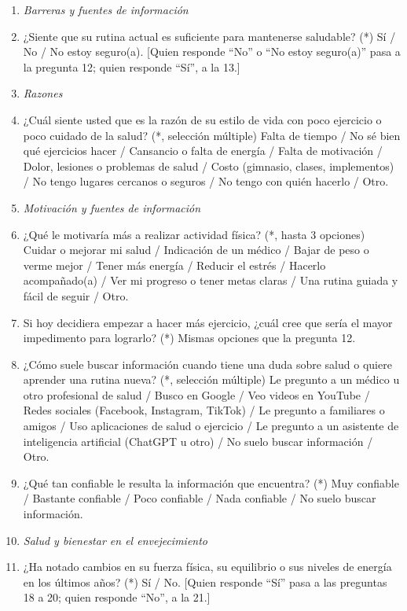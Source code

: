 \documentclass[12pt, letterpaper, table, xcdraw]{extarticle}
\begin{document}
{\begin{enumerate}[leftmargin=2em, itemsep=0.4em]
    \item[] \textit{Barreras y fuentes de información}
    \item ¿Siente que su rutina actual es suficiente para mantenerse saludable? (*) Sí / No / No estoy seguro(a). [Quien responde ``No'' o ``No estoy seguro(a)'' pasa a la pregunta 12; quien responde ``Sí'', a la 13.]

    \item[] \textit{Razones}
    \item ¿Cuál siente usted que es la razón de su estilo de vida con poco ejercicio o poco cuidado de la salud? (*, selección múltiple) Falta de tiempo / No sé bien qué ejercicios hacer / Cansancio o falta de energía / Falta de motivación / Dolor, lesiones o problemas de salud / Costo (gimnasio, clases, implementos) / No tengo lugares cercanos o seguros / No tengo con quién hacerlo / Otro.

    \item[] \textit{Motivación y fuentes de información}
    \item ¿Qué le motivaría más a realizar actividad física? (*, hasta 3 opciones) Cuidar o mejorar mi salud / Indicación de un médico / Bajar de peso o verme mejor / Tener más energía / Reducir el estrés / Hacerlo acompañado(a) / Ver mi progreso o tener metas claras / Una rutina guiada y fácil de seguir / Otro.
    \item Si hoy decidiera empezar a hacer más ejercicio, ¿cuál cree que sería el mayor impedimento para lograrlo? (*) Mismas opciones que la pregunta 12.
    \item ¿Cómo suele buscar información cuando tiene una duda sobre salud o quiere aprender una rutina nueva? (*, selección múltiple) Le pregunto a un médico u otro profesional de salud / Busco en Google / Veo videos en YouTube / Redes sociales (Facebook, Instagram, TikTok) / Le pregunto a familiares o amigos / Uso aplicaciones de salud o ejercicio / Le pregunto a un asistente de inteligencia artificial (ChatGPT u otro) / No suelo buscar información / Otro.
    \item ¿Qué tan confiable le resulta la información que encuentra? (*) Muy confiable / Bastante confiable / Poco confiable / Nada confiable / No suelo buscar información.

    \item[] \textit{Salud y bienestar en el envejecimiento}
    \item ¿Ha notado cambios en su fuerza física, su equilibrio o sus niveles de energía en los últimos años? (*) Sí / No. [Quien responde ``Sí'' pasa a las preguntas 18 a 20; quien responde ``No'', a la 21.]


\end{enumerate}}
\end{document}
